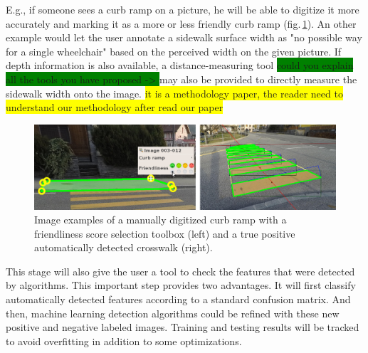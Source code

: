 \documentclass[10pt,conference,a4paper]{IEEEtran}
\begin{document}
E.g., if someone sees a curb ramp on a picture, he will be able to digitize it more accurately and marking it as a more or less friendly curb ramp (fig.\,\ref{curbramppicture}). An other example would let the user annotate a sidewalk surface width as %
"no possible way for a single wheelchair" based on the perceived width on the given picture. If depth information is also available, 
a distance-measuring tool \colorbox{green}{could you explain all the tools you have proposed ->	} may also be provided to directly measure the sidewalk width onto the image.
\colorbox{yellow}{it is a methodology paper, the reader need to understand our methodology after read our paper}



\begin{figure}[ht]
\begin{center}
\includegraphics[width=1.0\linewidth]{curb_ramp_crosswalk01.jpg}
\end{center}
   \caption{Image examples of a manually digitized curb ramp with a friendliness score selection toolbox (left) and a true positive automatically detected crosswalk (right).}\label{curbramppicture}
\end{figure}


This stage will also give the user a tool to check the features that were detected by algorithms. This important step provides two advantages. It will first classify automatically detected features according to a standard confusion matrix. And then, machine learning detection algorithms could be refined with these new positive and negative labeled images. Training and testing results will be tracked to avoid overfitting in addition to some optimizations.
\end{document}
